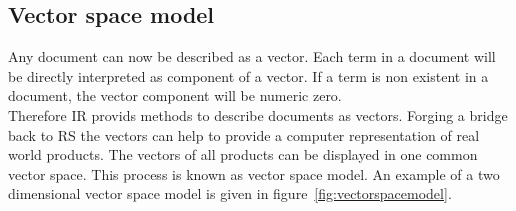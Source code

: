 \subsection{Vector space model}
\label{sec:vectorspacemodel}
Any document can now be described as a vector.
Each term in a document will be directly interpreted as component of a vector.
If a term is non existent in a document, the vector component will be numeric zero.\citep[p.~120]{manning:2009}\\
Therefore IR provids methods to describe documents as vectors.
Forging a bridge back to RS the vectors can help to provide a computer representation of real world products.
The vectors of all products can be displayed in one common vector space.
This process is known as vector space model.\citep[p.~120]{manning:2009}
An example of a two dimensional vector space model is given in figure~\ref{fig:vectorspacemodel}.


